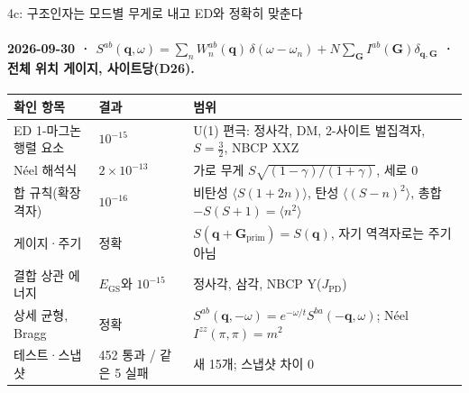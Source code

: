\begin{frame}[label=stage4c-structure-factor]{4c: 구조인자는 모드별 무게로 내고 ED와 정확히 맞춘다}
  \framesubtitle{2026-09-30 · $S^{ab}(\mathbf q,\omega)=\sum_nW_n^{ab}(\mathbf q)\,\delta(\omega-\omega_n)+N\sum_{\mathbf G}I^{ab}(\mathbf G)\delta_{\mathbf q,\mathbf G}$ · 전체 위치 게이지, 사이트당(D26).}
  \footnotesize\renewcommand{\arraystretch}{1.08}
  \begin{tabularx}{\textwidth}{@{}P{3.3cm}P{3.2cm}Y@{}}
    \toprule
    확인 항목 & 결과 & 범위 \\
    \midrule
    ED 1-마그논 행렬 요소 & $10^{-15}$ & U(1) 편극: 정사각, DM, 2-사이트 벌집격자, $S=\tfrac32$, NBCP XXZ \\
    Néel 해석식 & $2\times10^{-13}$ & 가로 무게 $S\sqrt{(1-\gamma)/(1+\gamma)}$, 세로 0 \\
    합 규칙(확장 격자) & $10^{-16}$ & 비탄성 $\langle S(1+2n)\rangle$, 탄성 $\langle(S-n)^2\rangle$, 총합 $-S(S+1)=\langle n^2\rangle$ \\
    게이지·주기 & 정확 & $S(\mathbf q+\mathbf G_{\mathrm{prim}})=S(\mathbf q)$, 자기 역격자로는 주기 아님 \\
    결합 상관 에너지 & $E_{\mathrm{GS}}$와 $10^{-15}$ & 정사각, 삼각, NBCP Y($J_{\mathrm{PD}}$) \\
    상세 균형, Bragg & 정확 & $S^{ab}(\mathbf q,-\omega)=e^{-\omega/t}S^{ba}(-\mathbf q,\omega)$; Néel $I^{zz}(\pi,\pi)=m^2$ \\
    테스트·스냅샷 & 452 통과 / 같은 5 실패 & 새 15개; 스냅샷 차이 0 \\
    \bottomrule
  \end{tabularx}
  \par\medskip
\end{frame}

